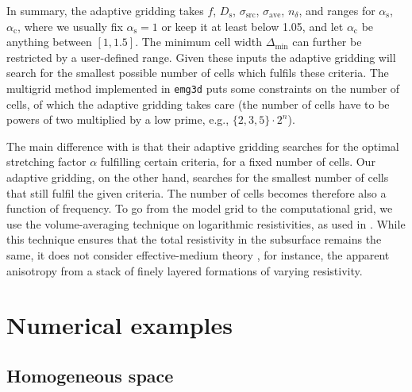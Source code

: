 \documentclass[
    manuscript,
  ]{geophysics}
\newcommand{\mr}[1]{\mathrm{#1}}
\newcommand{\emg}[2]{\texttt{emg#1#2}\xspace}
\begin{document}
In summary, the adaptive gridding takes $f$, $D_\mr{s}$, $\sigma_\mr{src}$,
$\sigma_\mr{ave}$, $n_\delta$, and ranges for $\alpha_\mr{s}$, $\alpha_\mr{c}$,
where we usually fix $\alpha_\mr{s}=1$ or keep it at least below 1.05, and let
$\alpha_\mr{c}$ be anything between $[1, 1.5]$. The minimum cell width
$\Delta_\mr{min}$ can further be restricted by a user-defined range. Given
these inputs the adaptive gridding will search for the smallest possible number
of cells which fulfils these criteria. The multigrid method implemented in
\emg3d puts some constraints on the number of cells, of which the adaptive
gridding takes care (the number of cells have to be powers of two multiplied by
a low prime, e.g., $\{2,3,5\}\cdot2^n$).

The main difference with \cite{GEO.08.Mulder} is that their adaptive gridding
searches for the optimal stretching factor $\alpha$ fulfilling certain
criteria, for a fixed number of cells. Our adaptive gridding, on the other
hand, searches for the smallest number of cells that still fulfil the given
criteria. The number of cells becomes therefore also a function of frequency.
To go from the model grid to the computational grid, we use the
volume-averaging technique on logarithmic resistivities, as used in
\cite{GEO.07.Plessix}. While this technique ensures that the total resistivity
in the subsurface remains the same, it does not consider effective-medium
theory \citep{GEO.03.Davydycheva}, for instance, the apparent anisotropy from a
stack of finely layered formations of varying resistivity.

\section{Numerical examples}

\subsection{Homogeneous space}
\end{document}
